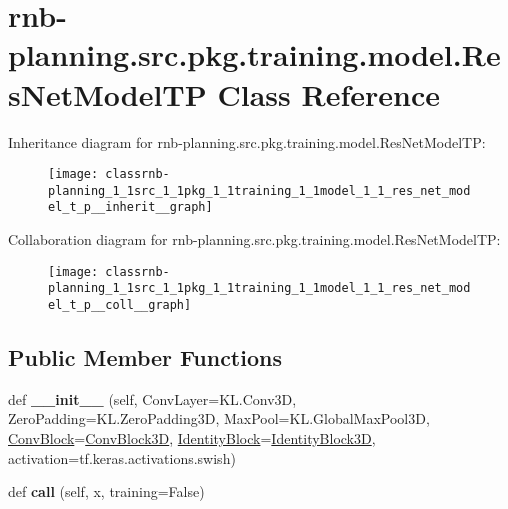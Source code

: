 \hypertarget{classrnb-planning_1_1src_1_1pkg_1_1training_1_1model_1_1_res_net_model_t_p}{}\section{rnb-\/planning.src.\+pkg.\+training.\+model.\+Res\+Net\+Model\+TP Class Reference}
\label{classrnb-planning_1_1src_1_1pkg_1_1training_1_1model_1_1_res_net_model_t_p}


Inheritance diagram for rnb-\/planning.src.\+pkg.\+training.\+model.\+Res\+Net\+Model\+TP\+:
\nopagebreak
\begin{figure}[H]
\begin{center}
\leavevmode
\texttt{[image: classrnb-planning\_1\_1src\_1\_1pkg\_1\_1training\_1\_1model\_1\_1\_res\_net\_model\_t\_p\_\_inherit\_\_graph]}
\end{center}
\end{figure}


Collaboration diagram for rnb-\/planning.src.\+pkg.\+training.\+model.\+Res\+Net\+Model\+TP\+:
\nopagebreak
\begin{figure}[H]
\begin{center}
\leavevmode
\texttt{[image: classrnb-planning\_1\_1src\_1\_1pkg\_1\_1training\_1\_1model\_1\_1\_res\_net\_model\_t\_p\_\_coll\_\_graph]}
\end{center}
\end{figure}
\subsection*{Public Member Functions}
\begin{DoxyCompactItemize}
\item 
\mbox{\label{classrnb-planning_1_1src_1_1pkg_1_1training_1_1model_1_1_res_net_model_t_p_a9ae67038a77aa80d924b7b2e25b46627}} 
def {\bfseries \+\_\+\+\_\+init\+\_\+\+\_\+} (self, Conv\+Layer=K\+L.\+Conv3D, Zero\+Padding=K\+L.\+Zero\+Padding3D, Max\+Pool=K\+L.\+Global\+Max\+Pool3D, \hyperlink{classrnb-planning_1_1src_1_1pkg_1_1training_1_1model_1_1_conv_block}{Conv\+Block}=\hyperlink{classrnb-planning_1_1src_1_1pkg_1_1training_1_1model_1_1_conv_block3_d}{Conv\+Block3D}, \hyperlink{classrnb-planning_1_1src_1_1pkg_1_1training_1_1model_1_1_identity_block}{Identity\+Block}=\hyperlink{classrnb-planning_1_1src_1_1pkg_1_1training_1_1model_1_1_identity_block3_d}{Identity\+Block3D}, activation=tf.\+keras.\+activations.\+swish)
\item 
\mbox{\label{classrnb-planning_1_1src_1_1pkg_1_1training_1_1model_1_1_res_net_model_t_p_aff7267d9cb0ba4111538a4cba32f4eb6}} 
def {\bfseries call} (self, x, training=False)
\end{DoxyCompactItemize}
